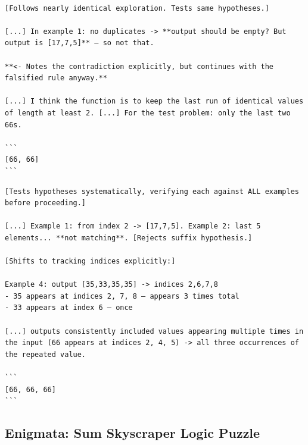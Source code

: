 \smallskip
\begin{tcolorbox}[
  enhanced, breakable, width=\linewidth,
  colback=orange!3, colframe=orange!50,
  title={\textbf{$RL_{individual}$}, contradictions noted but not used},
  fonttitle=\sffamily, coltitle=black
]
\begin{Verbatim}[fontsize=\footnotesize, breaklines, breakanywhere]

[Follows nearly identical exploration. Tests same hypotheses.]

[...] In example 1: no duplicates -> **output should be empty? But output is [17,7,5]** — so not that.

**<- Notes the contradiction explicitly, but continues with the falsified rule anyway.**

[...] I think the function is to keep the last run of identical values of length at least 2. [...] For the test problem: only the last two 66s.

```
[66, 66]
```
\end{Verbatim}
\end{tcolorbox}

\smallskip
\begin{tcolorbox}[
  enhanced, breakable, width=\linewidth,
  colback=green!5, colframe=green!75!black,
  title={\textbf{RACES}, index tracking and rule preservation across all demos},
  fonttitle=\sffamily, coltitle=black
]
\begin{Verbatim}[fontsize=\footnotesize, breaklines, breakanywhere]
[Tests hypotheses systematically, verifying each against ALL examples before proceeding.]

[...] Example 1: from index 2 -> [17,7,5]. Example 2: last 5 elements... **not matching**. [Rejects suffix hypothesis.]

[Shifts to tracking indices explicitly:]

Example 4: output [35,33,35,35] -> indices 2,6,7,8
- 35 appears at indices 2, 7, 8 — appears 3 times total
- 33 appears at index 6 — once

[...] outputs consistently included values appearing multiple times in the input (66 appears at indices 2, 4, 5) -> all three occurrences of the repeated value.

```
[66, 66, 66]
```
\end{Verbatim}
\end{tcolorbox}

\subsection{Enigmata: Sum Skyscraper Logic Puzzle}
\label{app:case-skyscraper}

